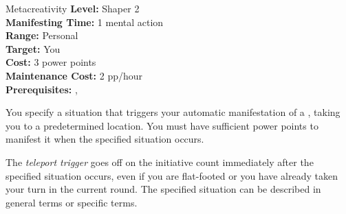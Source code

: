 {Metacreativity}
{
	\textbf{Level:}
	Shaper 2\\
	\textbf{Manifesting Time:}
	1 mental action\\
	\textbf{Range:}
	Personal\\
	\textbf{Target:}
	You\\
	\textbf{Cost:}
	3 power points\\
	\textbf{Maintenance Cost:}
	2 pp/hour\\
	\textbf{Prerequisites:}
	, \\
}
{
	You specify a situation that triggers your automatic manifestation of a , taking you to a predetermined location. You must have sufficient power points to manifest it when the specified situation occurs.

	The \emph{teleport trigger} goes off on the initiative count immediately after the specified situation occurs, even if you are flat-footed or you have already taken your turn in the current round. The specified situation can be described in general terms or specific terms.
}